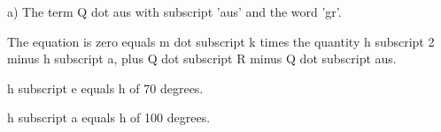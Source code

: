 a) The term Q dot aus with subscript 'aus' and the word 'gr'.

The equation is zero equals m dot subscript k times the quantity h subscript 2 minus h subscript a, plus Q dot subscript R minus Q dot subscript aus.

h subscript e equals h of 70 degrees.

h subscript a equals h of 100 degrees.